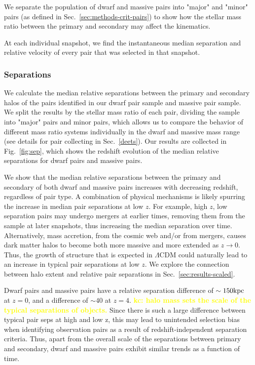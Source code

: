 \documentclass[twocolumn]{aastex631}
\newcommand{\kc}[1]{\textcolor{yellow}{\textbf{kc: #1}} }
\begin{document}
We separate the population of dwarf and massive pairs into "major" and "minor" pairs (as defined in Sec.~\ref{sec:methods-crit-pairs}) to show how the stellar mass ratio between the primary and secondary may affect the kinematics. 

At each individual snapshot, we find the instantaneous median separation and relative velocity of every pair that was selected in that snapshot. 

\subsubsection{Separations}
We calculate the median relative separations between the primary and secondary halos of the pairs identified in our dwarf pair sample and massive pair sample. 
We split the results by the stellar mass ratio of each pair, dividing the sample into "major" pairs and minor pairs, which allows us to compare the behavior of different mass ratio systems individually in the dwarf and massive mass range (see details for pair collecting in Sec.~\ref{deets}).
Our results are collected in Fig.~\ref{fig:sep}, which shows the redshift evolution of the median relative separations for dwarf pairs and massive pairs. 

We show that the median relative separations between the primary and secondary of both dwarf and massive pairs increases with decreasing redshift, regardless of pair type. 
A combination of physical mechanisms is likely spurring the increase in median pair separations at low $z$. 
For example, high $z$, low separation pairs may undergo mergers at earlier times, removing them from the sample at later snapshots, thus increasing the median separation over time. 
Alternatively, mass accretion, from the cosmic web and/or from mergers, causes dark matter halos to become both more massive and more extended as $z\to0$. 
Thus, the growth of structure that is expected in $\Lambda$CDM could naturally lead to an increase in typical pair separations at low $z$.
We explore the connection between halo extent and relative pair separations in Sec.~\ref{sec:results-scaled}.

Dwarf pairs and massive pairs have a relative separation difference of $\sim150\mathrm{kpc}$ at $z=0$, and a difference of $\sim40$ at $z=4$.   
\kc{halo mass sets the scale of the typical separations of objects.}
Since there is such a large difference between typical pair seps at high and low z, this may lead to unintended selection bias when identifying observation pairs as a result of redshift-independent separation criteria.
Thus, apart from the overall scale of the separations between primary and secondary, dwarf and massive pairs exhibit similar trends as a function of time. 
\end{document}
